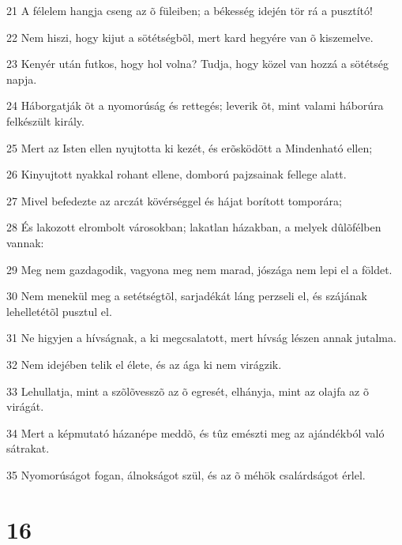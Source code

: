 \par 21 A félelem hangja cseng az õ füleiben; a békesség idején tör rá a pusztító!
\par 22 Nem hiszi, hogy kijut a sötétségbõl, mert kard hegyére van õ kiszemelve.
\par 23 Kenyér után futkos, hogy hol volna? Tudja, hogy közel van hozzá a sötétség napja.
\par 24 Háborgatják õt a nyomorúság és rettegés; leverik õt, mint valami háborúra felkészült király.
\par 25 Mert az Isten ellen nyujtotta ki kezét, és erõsködött a Mindenható ellen;
\par 26 Kinyujtott nyakkal rohant ellene, domború pajzsainak fellege alatt.
\par 27 Mivel befedezte az arczát kövérséggel és hájat borított tomporára;
\par 28 És lakozott elrombolt városokban; lakatlan házakban, a melyek dûlõfélben vannak:
\par 29 Meg nem gazdagodik, vagyona meg nem marad, jószága nem lepi el a földet.
\par 30 Nem menekül meg a setétségtõl, sarjadékát láng perzseli el, és szájának lehelletétõl pusztul el.
\par 31 Ne higyjen a hívságnak, a ki megcsalatott, mert hívság lészen annak jutalma.
\par 32 Nem idejében telik el élete, és az ága ki nem virágzik.
\par 33 Lehullatja, mint a szõlõvesszõ az õ egresét, elhányja, mint az olajfa az õ virágát.
\par 34 Mert a képmutató házanépe meddõ, és tûz emészti meg az ajándékból való sátrakat.
\par 35 Nyomorúságot fogan, álnokságot szül, és az õ méhök csalárdságot érlel.

\chapter{16}

